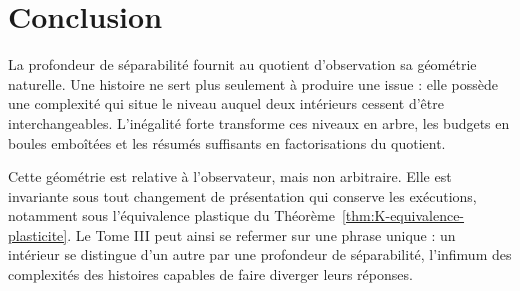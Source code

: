 \section{Conclusion}
\label{annexe-L-conclusion}

La profondeur de séparabilité fournit au quotient d'observation sa géométrie naturelle. Une histoire ne sert plus seulement à produire une issue : elle possède une complexité qui situe le niveau auquel deux intérieurs cessent d'être interchangeables. L'inégalité forte transforme ces niveaux en arbre, les budgets en boules emboîtées et les résumés suffisants en factorisations du quotient.

Cette géométrie est relative à l'observateur, mais non arbitraire. Elle est invariante sous tout changement de présentation qui conserve les exécutions, notamment sous l'équivalence plastique du Théorème~\ref{thm:K-equivalence-plasticite}. Le Tome III peut ainsi se refermer sur une phrase unique : un intérieur se distingue d'un autre par une profondeur de séparabilité, l'infimum des complexités des histoires capables de faire diverger leurs réponses.
